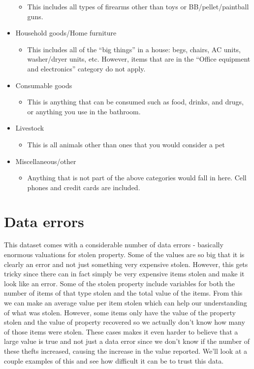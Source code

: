 \documentclass[
  12pt,
  openany]{book}
\providecommand{\tightlist}{%
  \setlength{\itemsep}{0pt}\setlength{\parskip}{0pt}}
\begin{document}
\begin{itemize}
  \begin{itemize}
  \tightlist
  \item
    This includes all types of firearms other than toys or BB/pellet/paintball guns.
  \end{itemize}
\item
  Household goods/Home furniture

  \begin{itemize}
  \tightlist
  \item
    This includes all of the ``big things'' in a house: begs, chairs, AC units, washer/dryer units, etc. However, items that are in the ``Office equipment and electronics'' category do not apply.
  \end{itemize}
\item
  Consumable goods

  \begin{itemize}
  \tightlist
  \item
    This is anything that can be consumed such as food, drinks, and drugs, or anything you use in the bathroom.
  \end{itemize}
\item
  Livestock

  \begin{itemize}
  \tightlist
  \item
    This is all animals other than ones that you would consider a pet
  \end{itemize}
\item
  Miscellaneous/other

  \begin{itemize}
  \tightlist
  \item
    Anything that is not part of the above categories would fall in here. Cell phones and credit cards are included.
  \end{itemize}
\end{itemize}

\hypertarget{data-errors}{%
\section{Data errors}\label{data-errors}}

This dataset comes with a considerable number of data errors - basically enormous valuations for stolen property. Some of the values are so big that it is clearly an error and not just something very expensive stolen. However, this gets tricky since there can in fact simply be very expensive items stolen and make it look like an error. Some of the stolen property include variables for both the number of items of that type stolen and the total value of the items. From this we can make an average value per item stolen which can help our understanding of what was stolen. However, some items only have the value of the property stolen and the value of property recovered so we actually don't know how many of those items were stolen. These cases makes it even harder to believe that a large value is true and not just a data error since we don't know if the number of these thefts increased, causing the increase in the value reported. We'll look at a couple examples of this and see how difficult it can be to trust this data.
\end{document}
